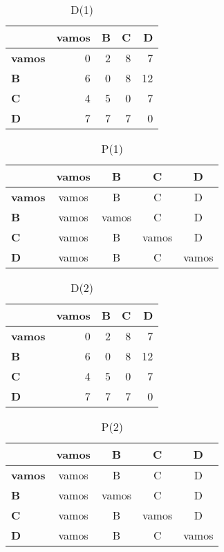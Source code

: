 \documentclass{article}
\begin{document}
\begin{table}[H]\centering
\caption{D(1)}
\begin{tabular}{l r r r r}
\toprule
 & \textbf{vamos} & \textbf{B} & \textbf{C} & \textbf{D}\\\midrule
\textbf{vamos} & 0 & 2 & 8 & 7 \\
\textbf{B} & 6 & 0 & 8 & 12 \\
\textbf{C} & 4 & 5 & 0 & 7 \\
\textbf{D} & 7 & 7 & 7 & 0 \\
\bottomrule
\end{tabular}
\end{table}

\begin{table}[H]\centering
\caption{P(1)}
\begin{tabular}{l c c c c}
\toprule
 & \textbf{vamos} & \textbf{B} & \textbf{C} & \textbf{D}\\\midrule
\textbf{vamos} & \cellcolor{yellow!30}vamos & B & C & D \\
\textbf{B} & vamos & \cellcolor{yellow!30}vamos & C & D \\
\textbf{C} & vamos & B & \cellcolor{yellow!30}vamos & D \\
\textbf{D} & vamos & B & C & \cellcolor{yellow!30}vamos \\
\bottomrule
\end{tabular}
\end{table}

\begin{table}[H]\centering
\caption{D(2)}
\begin{tabular}{l r r r r}
\toprule
 & \textbf{vamos} & \textbf{B} & \textbf{C} & \textbf{D}\\\midrule
\textbf{vamos} & 0 & 2 & 8 & 7 \\
\textbf{B} & 6 & 0 & 8 & 12 \\
\textbf{C} & 4 & 5 & 0 & 7 \\
\textbf{D} & 7 & 7 & 7 & 0 \\
\bottomrule
\end{tabular}
\end{table}

\begin{table}[H]\centering
\caption{P(2)}
\begin{tabular}{l c c c c}
\toprule
 & \textbf{vamos} & \textbf{B} & \textbf{C} & \textbf{D}\\\midrule
\textbf{vamos} & vamos & B & C & D \\
\textbf{B} & vamos & vamos & C & D \\
\textbf{C} & vamos & B & vamos & D \\
\textbf{D} & vamos & B & C & vamos \\
\bottomrule
\end{tabular}
\end{table}
\end{document}
